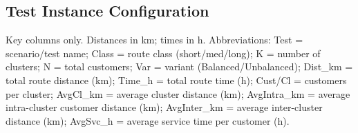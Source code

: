 \documentclass[trsc,dblanonrev]{informs4}
\begin{document}




\begin{APPENDICES}

\section{Test Instance Configuration}\label{appendix:Test_Instance}

\begin{table}
\TABLE
{Key columns only. Distances in km; times in h. Abbreviations: Test = scenario/test name; Class = route class (short/med/long); K = number of clusters; N = total customers; Var = variant (Balanced/Unbalanced); Dist\_km = total route distance (km); Time\_h = total route time (h); Cust/Cl = customers per cluster; AvgCl\_km = average cluster distance (km); AvgIntra\_km = average intra-cluster customer distance (km); AvgInter\_km = average inter-cluster distance (km); AvgSvc\_h = average service time per customer (h).\label{tab:test_instance_config}}
{\small\setlength{\tabcolsep}{3pt}\renewcommand{\arraystretch}{1.2}
\centering
{}}
\end{table}
\end{APPENDICES}
\end{document}
